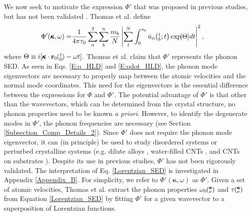 We now seek to motivate the 
expression $\Phi'$ that was proposed in previous studies, but has not 
been validated 
\cite{maruyama_molecular_2003,shiomi_non-fourier_2006,
thomas_predicting_2010}. Thomas et al. 
\cite{thomas_predicting_2010} define
\begin{equation}\label{Lorentzian_SED}
\begin{split}
\Phi'(\pmb{\kappa},\omega) =& \frac{1}{4\pi\tau_0} \sum_\alpha^3 
\sum_b^n \frac{m_b}{N}
\left| \sum_l^N  \int_{0}^{\tau_0} \dot{u}_{\alpha}\mspace{-4.0mu}\left(\mspace{-8.0mu} \begin{smallmatrix}&l \\&b\end{smallmatrix}\mspace{-2.0mu};t\right) \exp\mspace{-5.0mu}\left[\Theta\right]\mspace{-3.0mu} dt 
\right|^2,
\end{split}
\end{equation}
where $\Theta \equiv i[\pmb{\kappa}\cdot\mathbf{r}_0\ab{l}{0}-\omega t]$. 
Thomas et al. \cite{thomas_predicting_2010} claim that $\Phi'$ 
represents the phonon SED. As seen in 
Eqs. \eqref{E:q_HLD} and \eqref{E:qdot_HLD}, the phonon mode 
eigenvectors are necessary to properly map between the atomic 
velocities and the normal mode coordinates. This need for the 
eigenvectors is the essential difference between the expressions 
for $\Phi$ and $\Phi'$. The potential 
advantage of $\Phi'$ is that other than the wavevectors, which can be 
determined from the 
crystal structure, no phonon properties need to be known {\em a priori}. 
However, to identify 
the degenerate modes in $\Phi'$, the phonon frequencies are necessary 
(see Section 
\ref{Subsection_Comp_Details_2}). Since $\Phi'$ does not require the phonon 
mode eigenvector, 
it can (in principle) be used to study disordered systems or perturbed 
crystalline systems 
(e.g. dilute alloys \cite{shiomi_thermal_2011}, water-filled CNTs 
\cite{thomas_predicting_2010}, and CNTs on 
substrates \cite{ong_reduction_2011}). Despite its use in previous studies, 
$\Phi'$ has not been 
rigorously validated. The interpretation of Eq. \eqref{Lorentzian_SED} 
is investigated in Appendix \ref{Appendix_B}.  
For simplicity, we refer to $\Phi'(\pmb{\kappa},\omega)$ 
as $\Phi'$. Given a set of atomic velocities, Thomas et al. extract the 
phonon properties 
$\omega_0\mspace{-4.0mu}\left(\mspace{-8.0mu} \begin{smallmatrix}&\pmb{\kappa} \\&\nu\end{smallmatrix} \mspace{-3.0mu}\right)$ and $\tau\mspace{-4.0mu}\left(\mspace{-8.0mu} \begin{smallmatrix}&\pmb{\kappa} \\&\nu\end{smallmatrix} \mspace{-3.0mu}\right)$ from Equation \eqref{Lorentzian_SED} by 
fitting $\Phi'$ for a 
given wavevector to a superposition of Lorentzian functions.


